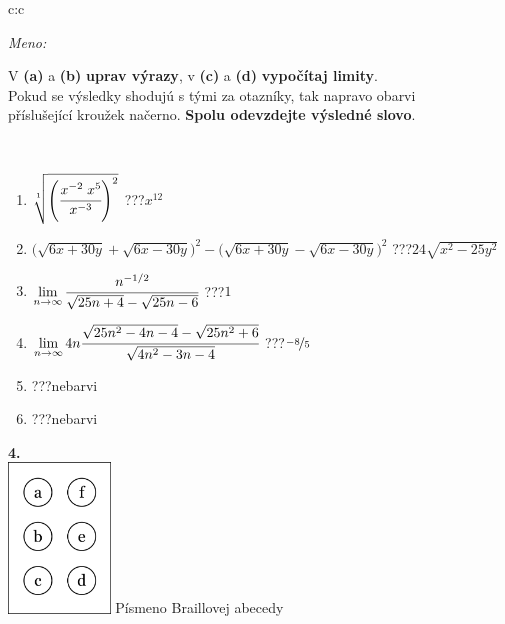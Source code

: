 \documentclass[10pt]{report}
\begin{document}
\begin{tabular}{c:c}
\begin{minipage}[c][104.5mm][t]{0.5\linewidth}
\begin{center}
\textit{Meno:}\phantom{xxxxxxxxxxxxxxxxxxxxxxxxxxxxxxxxxxxxxxxxxxxxxxxxxxxxxxxxxxxxxxxxx}\\[5mm]
\begin{minipage}{0.95\linewidth}
\begin{center}
V \textbf{(a)} a \textbf{(b)} \textbf{uprav výrazy}, v \textbf{(c)} a \textbf{(d)} \textbf{vypočítaj limity}.\\Pokud se výsledky shodujú s tými za otazníky, tak napravo obarvi\\příslušející kroužek načerno. \textbf{Spolu odevzdejte výsledné slovo}.
\end{center}
\end{minipage}
\\[1mm]
\begin{minipage}{0.79\linewidth}
\begin{center}
\begin{varwidth}{\linewidth}
\begin{enumerate}
\small
\item $\sqrt[1]{\left(\cfrac{x^{-2}\;x^{5}}{x^{-3}}\right)^{2}}$\quad \dotfill\; ???\;\dotfill \quad $x^{12}$
\item {\footnotesize{\scriptsize$\big(\sqrt{6x+30y}+\sqrt{6x-30y}\big)^2-\big(\sqrt{6x+30y}-\sqrt{6x-30y}\big)^2$}\quad \dotfill\; ???\;\dotfill \quad $24\sqrt{x^2-25y^2}$}
\item $\lim\limits_{n\to\infty}\cfrac{n^{-1/2}}{\sqrt{25n+4}-\sqrt{25n-6}}$\quad \dotfill\; ???\;\dotfill \quad $1$
\item $\lim\limits_{n\to\infty}4n\cfrac{\sqrt{25n^2-4n-4}-\sqrt{25n^2+6}}{\sqrt{4n^2-3n-4}}$\quad \dotfill\; ???\;\dotfill \quad $\nicefrac{-8}{5}$
\item \quad \dotfill\; ???\;\dotfill \quad nebarvi
\item \quad \dotfill\; ???\;\dotfill \quad nebarvi
\end{enumerate}
\end{varwidth}
\end{center}
\end{minipage}
\begin{minipage}{0.20\linewidth}
\begin{center}
{\Huge\bfseries 4.} \\[2mm]
\includegraphics[height=40mm]{../images/braille.png}
{\small Písmeno Braillovej abecedy}
\end{center}
\end{minipage}
\end{center}
\end{minipage}
%
\end{tabular}
\end{document}
